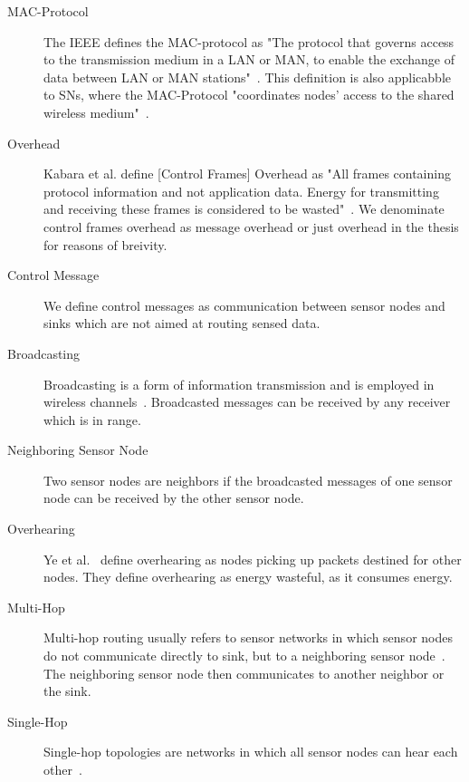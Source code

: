 \begin{description}
    \item[\ac{MAC}-Protocol]
        The \ac{IEEE} defines the \ac{MAC}-protocol as "The protocol that
        governs access to the transmission medium in a \ac{LAN} or \ac{MAN}, to
        enable the exchange of data between \ac{LAN} or \ac{MAN}
        stations"~\cite{ieee802}. This definition is also applicabble to
        \acp{SN}, where the \ac{MAC}-Protocol "coordinates nodes' access to the
        shared wireless medium"~\cite{kredo2007hybrid}.

    \item[Overhead]
        Kabara et al. define [Control Frames] Overhead as "All frames
        containing protocol information and not application data. Energy for
        transmitting and receiving these frames is considered to be
        wasted"~\cite{kabara2012mac}. We denominate control frames overhead as
        message overhead or just overhead in the thesis for reasons of
        breivity.

    \item[Control Message]
        We define control messages as communication between sensor nodes and
        sinks which are not aimed at routing sensed data.

    \item[Broadcasting]
        Broadcasting is a form of information transmission and is employed in wireless
        channels~\cite{lee2013energy}. Broadcasted messages can be received by
        any receiver which is in range.

    \item[Neighboring Sensor Node]
        Two sensor nodes are neighbors if the broadcasted messages of one
        sensor node can be received by the other sensor node. 

    \item[Overhearing]
        Ye et al.~\cite{ye2004medium} define overhearing as nodes picking up
        packets destined for other nodes. They define overhearing as energy
        wasteful, as it consumes energy.

    \item[Multi-Hop]
        Multi-hop routing usually refers to sensor networks in which sensor
        nodes do not communicate directly to sink, but to a neighboring sensor
        node~\cite{yaacoub2012multihop}. The neighboring sensor node then
        communicates to another neighbor or the sink.

    \item[Single-Hop]
        Single-hop topologies are networks in which all sensor nodes can hear
        each other~\cite{ye2004medium}.


\end{description}
